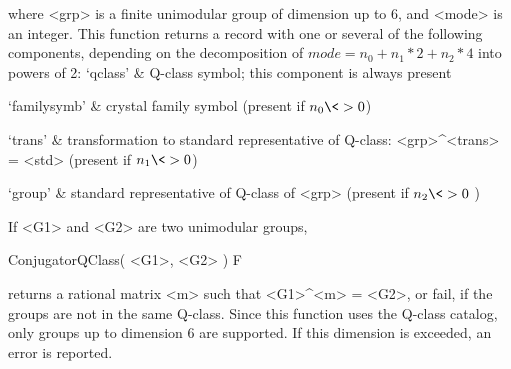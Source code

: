 where <grp> is a finite unimodular group of dimension up to 6, and
<mode> is an integer. This function returns a record with one or
several of the following components, depending on the decomposition of
$mode = n_{0} + n_{1} * 2 + n_{2} * 4$ into powers of 2:
\beginitems
`qclass'     & Q-class symbol; this component is always present

`familysymb' & crystal family symbol (present if $n_{0} \<> 0$)

`trans'      & transformation to standard representative of Q-class: 
               <grp>\^{}<trans> = <std>
               (present if $n_{1} \<> 0$)

`group'      & standard representative of Q-class of <grp> 
               (present if $n_{2} \<> 0$ )
\enditems

If <G1> and <G2> are two unimodular groups,

\>ConjugatorQClass( <G1>, <G2> ) F

returns a rational matrix <m> such that <G1>\^{}<m> = <G2>, or fail, if 
the groups are not in the same Q-class. Since this function uses the 
{\CARAT} Q-class catalog, only groups up to dimension 6 are supported. 
If this dimension is exceeded, an error is reported.


